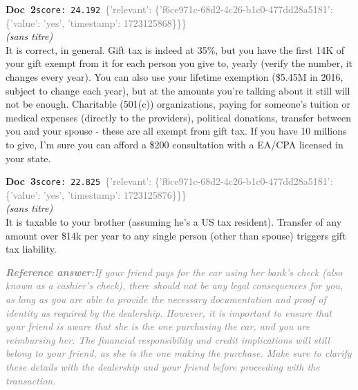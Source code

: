 \documentclass[a4paper,11pt]{article}
\begin{document}
\begin{docenv}
{\footnotesize\textcolor{doccolor}{\textbf{Doc~2}}}\hfill{\tiny\texttt{score:~24.192}}\ {\tiny\textcolor{gray}{\{'relevant': \{'f6ce971c-68d2-4c26-b1c0-477dd28a5181': \{'value': 'yes', 'timestamp': 1723125868\}\}\}}}\\[3pt]
{\small\textit{(sans titre)}}\\[2pt]
\vspace{2pt}
{\footnotesize 
It is correct, in general. Gift tax is indeed at 35\%, but you have the first 14K of your gift exempt from it for each person you give to, yearly (verify the number, it changes every year). You can also use your lifetime exemption (\$5.45M in 2016, subject to change each year), but at the amounts you're talking about it still will not be enough. Charitable (501(c)) organizations, paying for someone's tuition or medical expenses (directly to the providers), political donations, transfer between you and your spouse - these are all exempt from gift tax. If you have 10 millions to give, I'm sure you can afford a \$200 consultation with a EA/CPA licensed in your state.}
\end{docenv}
\begin{docenv}
{\footnotesize\textcolor{doccolor}{\textbf{Doc~3}}}\hfill{\tiny\texttt{score:~22.825}}\ {\tiny\textcolor{gray}{\{'relevant': \{'f6ce971c-68d2-4c26-b1c0-477dd28a5181': \{'value': 'yes', 'timestamp': 1723125876\}\}\}}}\\[3pt]
{\small\textit{(sans titre)}}\\[2pt]
\vspace{2pt}
{\footnotesize 
It is taxable to your brother (assuming he's a US tax resident). Transfer of any amount over \$14k per year to any single person (other than spouse) triggers gift tax liability.}
\end{docenv}
\begin{refanswerenv}
{\footnotesize\textit{\textcolor{gray}{\textbf{Reference answer:}\enspace If your friend pays for the car using her bank's check (also known as a cashier's check), there should not be any legal consequences for you, as long as you are able to provide the necessary documentation and proof of identity as required by the dealership. However, it is important to ensure that your friend is aware that she is the one purchasing the car, and you are reimbursing her. The financial responsibility and credit implications will still belong to your friend, as she is the one making the purchase. Make sure to clarify these details with the dealership and your friend before proceeding with the transaction.}}}
\end{refanswerenv}
\end{document}
